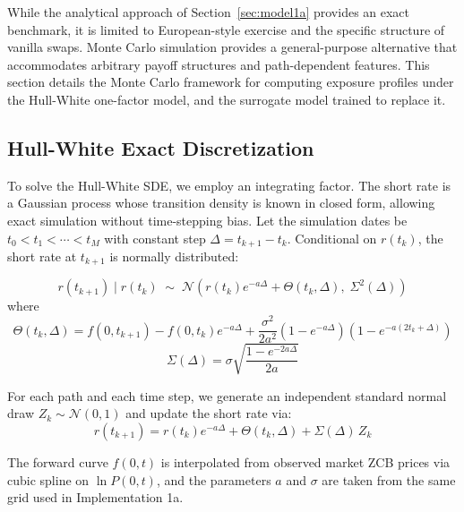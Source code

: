   While the analytical approach of Section~\ref{sec:model1a} provides an exact benchmark, it is limited to European-style exercise and the specific structure of vanilla swaps. Monte Carlo
  simulation provides a general-purpose alternative that accommodates arbitrary payoff structures and path-dependent features. This section details the Monte Carlo framework for computing
  exposure profiles under the Hull-White one-factor model, and the surrogate model trained to replace it.

  \subsection{Hull-White Exact Discretization}

  To solve the Hull-White SDE, we employ an integrating factor. The short rate is a Gaussian process whose transition density is known in closed form, allowing exact simulation without time-stepping bias. Let the simulation dates be $t_0 < t_1 < \cdots < t_M$ with constant step $\Delta = t_{k+1} - t_k$. Conditional on $r(t_k)$, the short rate at
   $t_{k+1}$ is normally distributed:

  \begin{equation}\label{eq:hw_transition}
      r(t_{k+1}) \mid r(t_k) \;\sim\; \mathcal{N}\!\left(r(t_k)e^{-a\Delta} + \Theta(t_k, \Delta),\; \Sigma^2(\Delta)\right)
  \end{equation}
  where
  \begin{equation}
      \Theta(t_k, \Delta) = f(0, t_{k+1}) - f(0, t_k)e^{-a\Delta} + \frac{\sigma^2}{2a^2}\left(1 - e^{-a\Delta}\right)\left(1 - e^{-a(2t_k + \Delta)}\right)
  \end{equation}
  \begin{equation}
      \Sigma(\Delta) = \sigma\sqrt{\frac{1 - e^{-2a\Delta}}{2a}}
  \end{equation}

  \noindent
  For each path and each time step, we generate an independent standard normal draw $Z_k \sim \mathcal{N}(0,1)$ and update the short rate via:
  \begin{equation}\label{eq:hw_update}
      r(t_{k+1}) = r(t_k)e^{-a\Delta} + \Theta(t_k, \Delta) + \Sigma(\Delta)\, Z_k
  \end{equation}

  \noindent
  The forward curve $f(0,t)$ is interpolated from observed market ZCB prices via cubic spline on $\ln P(0, t)$, and the parameters $a$ and $\sigma$ are taken from the same grid used in
  Implementation 1a.

